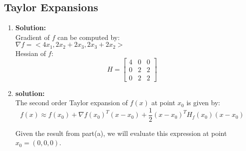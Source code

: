 \subsection{Taylor Expansions}

\begin{enumerate}
    \item \textbf{Solution:} \\
        Gradient of \(f\) can be computed by:\\
        \(\nabla{f} = <4x_1, 2x_2 + 2x_3, 2x_3 + 2x_2>\)\\ 
        Hessian of \(f\):\\
        \[
        H =     
            \begin{bmatrix}
                4 & 0 & 0\\
                0 & 2  & 2\\
                0 & 2  & 2
            \end{bmatrix}
        \]

    \item \textbf{solution:}\\
    The second order Taylor expansion of \(f(x)\) at point \(x_0\) is given by:
    \[
    f(x) \approx f\left(x_0\right)+\nabla f\left(x_0\right)^T\left(x-x_0\right)+\frac{1}{2}\left(x-x_0\right)^T H_f\left(x_0\right)\left(x-x_0\right)
    \]
    
    Given the result from part(a), we will evaluate this expression at point \(x_0 =(0, 0, 0)\).
    

\end{enumerate}
